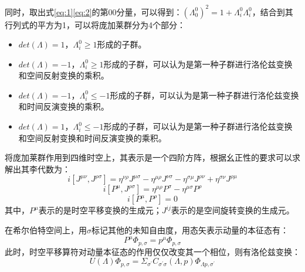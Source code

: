 \documentclass[10pt,a4paper]{article}
\begin{document}
同时，取出式\eqref{eq:1}\eqref{eq:2}的第00分量，可以得到：$(\Lambda^0_0)^2=1+\Lambda^0_i\Lambda^0_i$，结合到其行列式的平方为1，可以将庞加莱群分为4个部分：

\begin{itemize}
\label{iterm:1}
	\item{$det(\Lambda)=1$，$\Lambda^0_i\geq 1$形成的子群。}
	\item{$det(\Lambda)=-1$，$\Lambda^0_i\geq 1$形成的子群，可以认为是第一种子群进行洛伦兹变换和空间反射变换的乘积。}
	\item{$det(\Lambda)=-1$，$\Lambda^0_i\leq -1$形成的子群，可以认为是第一种子群进行洛伦兹变换和时间反演变换的乘积。}
	\item{$det(\Lambda)=1$，$\Lambda^0_i\leq -1$形成的子群，可以认为是第一种子群进行洛伦兹变换和空间反射变换和时间反演变换的乘积。}
\end{itemize}

将庞加莱群作用到四维时空上，其表示是一个四阶方阵，根据幺正性的要求可以求解出其李代数为：
\begin{equation}
\label{eq:7}
i[J^{\mu\nu},J^{\rho\sigma}]=\eta^{\nu\rho}J^{\mu\sigma}-\eta^{\mu\rho}J^{\nu\sigma}-\eta^{\sigma\mu}J^{\rho\nu}+\eta^{\sigma\nu}J^{\rho\mu}
\end{equation}
\begin{equation}
\label{eq:8}
i[P^{\mu},J^{\rho\sigma}]=\eta^{\mu\rho}P^{\sigma}-\eta^{\mu\sigma}P^{\rho}
\end{equation}
\begin{equation}
\label{eq:9}
i[P^{\mu},P^{\rho}]=0
\end{equation}
其中，$P^{\mu}$表示的是时空平移变换的生成元；$J^{ij}$表示的是空间旋转变换的生成元。

在希尔伯特空间上，用$\sigma$标记其他的未知自由度，用态矢表示动量的本征态有：
\begin{equation}
\label{eq:10}
P^{\mu}\Phi_{p,\sigma}=p^{\mu}\Phi_{p,\sigma}
\end{equation}
此时，时空平移算符对动量本征态的作用仅仅改变其一个相位，则有洛伦兹变换：
\begin{equation}
\label{eq:11}
U(\Lambda)\Phi_{p,\sigma}=\Sigma_{\sigma^{\prime}} C_{\sigma^{\prime}\sigma}(\Lambda,p) \Phi_{\Lambda p,\sigma^{\prime}}
\end{equation}
\end{document}

